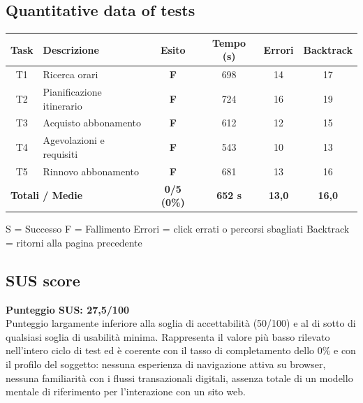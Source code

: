 ﻿\documentclass[11pt,a4paper]{article}
\begin{document}
\subsection*{Quantitative data of tests}
\begin{tcolorbox}[base]
\begin{center}
\renewcommand{\arraystretch}{1.4}
\begin{tabular}{clcccc}
\toprule
\textbf{Task} & \textbf{Descrizione} &
\textbf{Esito} & \textbf{Tempo (s)} &
\textbf{Errori} & \textbf{Backtrack} \\
\midrule
T1 & Ricerca orari             & \textbf{F} & 698 & 14 & 17 \\
T2 & Pianificazione itinerario & \textbf{F} & 724 & 16 & 19 \\
T3 & Acquisto abbonamento      & \textbf{F} & 612 & 12 & 15 \\
T4 & Agevolazioni e requisiti  & \textbf{F} & 543 & 10 & 13 \\
T5 & Rinnovo abbonamento       & \textbf{F} & 681 & 13 & 16 \\
\midrule
\multicolumn{2}{l}{\textbf{Totali / Medie}} &
\textbf{0/5 (0\%)} & \textbf{652 s} &
\textbf{13,0} & \textbf{16,0} \\
\bottomrule
\end{tabular}
\end{center}
\vspace{0.3cm}
\small S = Successo \quad F = Fallimento \quad
Errori = click errati o percorsi sbagliati \quad
Backtrack = ritorni alla pagina precedente
\end{tcolorbox}

\subsection*{SUS score}
\begin{tcolorbox}[base]
\textbf{Punteggio SUS: 27,5/100}\\[0.2cm]
\small Punteggio largamente inferiore alla soglia di
accettabilità (50/100) e al di sotto di qualsiasi soglia
di usabilità minima. Rappresenta il valore più basso
rilevato nell'intero ciclo di test ed è coerente con il
tasso di completamento dello 0\% e con il profilo del
soggetto: nessuna esperienza di navigazione attiva su
browser, nessuna familiarità con i flussi transazionali
digitali, assenza totale di un modello mentale di
riferimento per l'interazione con un sito web.
\end{tcolorbox}
\end{document}
